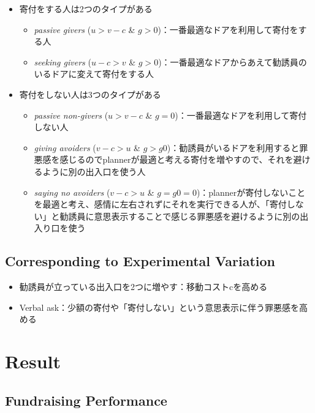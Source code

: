 \documentclass[../root]{subfiles}
\begin{document}
    \begin{itemize}
        \item 寄付をする人は2つのタイプがある
        \begin{itemize}
            \item \textit{passive givers} ($u > v - c$ \& $g > 0$)：一番最適なドアを利用して寄付をする人
            \item \textit{seeking givers} ($u - c > v$ \& $g > 0$)：一番最適なドアからあえて勧誘員のいるドアに変えて寄付をする人
        \end{itemize}
        \item 寄付をしない人は3つのタイプがある
        \begin{itemize}
            \item \textit{passive non-givers} ($u > v - c$ \& $g = 0$)：一番最適なドアを利用して寄付しない人
            \item \textit{giving avoiders} ($v - c > u$ \& $g > g0$)：勧誘員がいるドアを利用すると罪悪感を感じるのでplannerが最適と考える寄付を増やすので、それを避けるように別の出入口を使う人
            \item \textit{saying no avoiders} ($v - c > u$ \& $g = g0 = 0$)：plannerが寄付しないことを最適と考え、感情に左右されずにそれを実行できる人が、「寄付しない」と勧誘員に意思表示することで感じる罪悪感を避けるように別の出入り口を使う
        \end{itemize}
    \end{itemize}

    \subsection{Corresponding to Experimental Variation}

    \begin{itemize}
        \item 勧誘員が立っている出入口を2つに増やす：移動コストcを高める
        \item Verbal ask：少額の寄付や「寄付しない」という意思表示に伴う罪悪感を高める
    \end{itemize}


    \section{Result}

    \subsection{Fundraising Performance}
\end{document}

